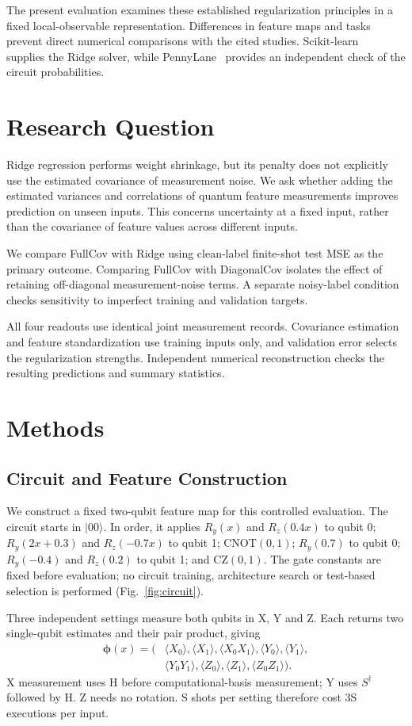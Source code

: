 \documentclass[conference]{IEEEtran}
\begin{document}
The present evaluation examines these established regularization principles in a fixed local-observable representation. Differences in feature maps and tasks prevent direct numerical comparisons with the cited studies. Scikit-learn~\cite{sklearn} supplies the Ridge solver, while PennyLane~\cite{pennylane} provides an independent check of the circuit probabilities.

\section{Research Question}
Ridge regression performs weight shrinkage, but its penalty does not explicitly use the estimated covariance of measurement noise. We ask whether adding the estimated variances and correlations of quantum feature measurements improves prediction on unseen inputs. This concerns uncertainty at a fixed input, rather than the covariance of feature values across different inputs.

We compare FullCov with Ridge using clean-label finite-shot test MSE as the primary outcome. Comparing FullCov with DiagonalCov isolates the effect of retaining off-diagonal measurement-noise terms. A separate noisy-label condition checks sensitivity to imperfect training and validation targets.

All four readouts use identical joint measurement records. Covariance estimation and feature standardization use training inputs only, and validation error selects the regularization strengths. Independent numerical reconstruction checks the resulting predictions and summary statistics.

\section{Methods}
\subsection{Circuit and Feature Construction}
We construct a fixed two-qubit feature map for this controlled evaluation. The circuit starts in $|00\rangle$. In order, it applies $R_y(x)$ and $R_z(0.4x)$ to qubit 0; $R_y(2x+0.3)$ and $R_z(-0.7x)$ to qubit 1; CNOT$(0,1)$; $R_y(0.7)$ to qubit 0; $R_y(-0.4)$ and $R_z(0.2)$ to qubit 1; and CZ$(0,1)$. The gate constants are fixed before evaluation; no circuit training, architecture search or test-based selection is performed (Fig.~\ref{fig:circuit}).

Three independent settings measure both qubits in X, Y and Z. Each returns two single-qubit estimates and their pair product, giving
\begin{equation}
\begin{split}
\boldsymbol\phi(x)=(&\langle X_0\rangle,\langle X_1\rangle,\langle X_0X_1\rangle,
\langle Y_0\rangle,\langle Y_1\rangle,\\
&\langle Y_0Y_1\rangle,\langle Z_0\rangle,\langle Z_1\rangle,\langle Z_0Z_1\rangle).
\end{split}
\end{equation}
X measurement uses H before computational-basis measurement; Y uses $S^\dagger$ followed by H. Z needs no rotation. S shots per setting therefore cost 3S executions per input.
\end{document}
